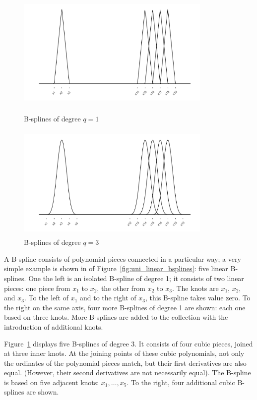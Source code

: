 \documentclass[12pt]{article}
\begin{document}
\begin{figure}[H]
  \centering
  \graphicspath{{img/}}
  \includegraphics[width=3.7in, height=2.2in]{uni_linear_bsplines.png}
  \caption{B-splines of degree $q=1$}\label{fig:uni_linear_bsplines}
  \includegraphics[width=3.7in, height=2.2in]{uni_cubic_bsplines.png}
  \caption{B-splines of degree $q=3$}\label{fig:uni_cubic_bsplines}
\end{figure} 

A B-spline consists of polynomial pieces connected in a particular way; a very simple example is shown in of Figure~\ref{fig:uni_linear_bsplines}: five linear B-splines. One the left is an isolated B-spline of degree 1; it consists of two linear pieces: one piece from $x_1$ to $x_2$, the other from $x_2$ to $x_3$. The knots are $x_1$, $x_2$, and $x_3$. To the left of $x_1$ and to the right of $x_3$, this B-spline takes value zero. To the right on the same axis, four more B-splines of degree 1 are shown: each one based on three knots. More B-splines are added to the collection with the introduction of additional knots.

Figure~\ref{fig:uni_cubic_bsplines} displays five B-splines of degree 3. It consists of four cubic pieces, joined at three inner knots. At the joining points of these cubic polynomials, not only the ordinates of the polynomial pieces match, but their first derivatives are also equal. (However, their second derivatives are not necessarily equal). The B-spline is based on five adjacent knots: $x_1,\dots,x_5$. To the right, four additional cubic B-splines are shown.
\end{document}
